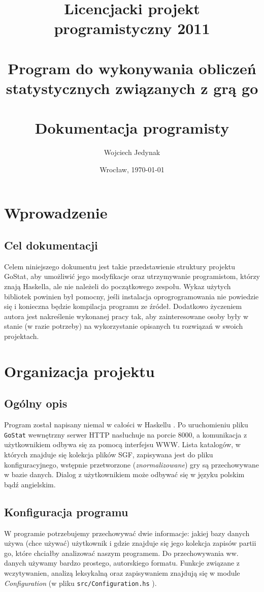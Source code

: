 \documentclass[10pt,leqno]{article}
\title{\LARGE Licencjacki projekt programistyczny 2011 \\ 
       \ \\
       Program do wykonywania obliczeń statystycznych związanych z grą go \\ 
       \ \\
       Dokumentacja programisty }
\author{Wojciech Jedynak}
\date{Wrocław, \today}
\newcommand{\cmd}[1]{
  \texttt{#1}
}
\begin{document}
\maketitle 

\newpage

\tableofcontents

\newpage

\section{Wprowadzenie}

\subsection{Cel dokumentacji}
Celem niniejszego dokumentu jest takie przedstawienie struktury projektu GoStat, aby umożliwić jego modyfikacje oraz utrzymywanie programistom, którzy
znają Haskella, ale nie należeli do początkowego zespołu. Wykaz użytych bibliotek powinien był pomocny, jeśli instalacja oprogrogramowania nie powiedzie 
się i konieczna będzie kompilacja programu ze źródeł. Dodatkowo życzeniem autora jest nakreślenie wykonanej pracy tak, aby zainteresowane osoby
były w stanie (w razie potrzeby) na wykorzystanie opisanych tu rozwiązań w swoich projektach.

\section{Organizacja projektu}

\subsection{Ogólny opis}
Program został napisany niemal w całości w Haskellu \cite{haskell}. 
Po uruchomieniu pliku \cmd{GoStat} wewnętrzny serwer HTTP nasłuchuje na porcie 8000, 
a komunikacja z użytkownikiem odbywa się za pomocą interfejsu WWW. 
Lista katalogów, w których znajduje się kolekcja plików SGF, zapisywana jest do pliku konfiguracyjnego,
wstępnie przetworzone (\emph{znormalizowane}) gry są przechowywane w bazie danych. Dialog z użytkownikiem może odbywać się w języku
polskim bądź angielskim.

\subsection{Konfiguracja programu}

W programie potrzebujemy przechowywać dwie informacje: jakiej bazy danych używa (chce używać) użytkownik i gdzie znajduje się jego
kolekcja zapisów partii go, które chciałby analizować naszym programem. Do przechowywania ww. danych używamy bardzo prostego, 
autorskiego formatu. Funkcje związane z wczytywanien, analizą leksykalną oraz zapisywaniem znajdują się w module \emph{Configuration}
(w pliku \cmd{src/Configuration.hs}).
\end{document}
